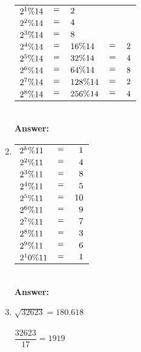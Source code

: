 \documentclass[8pt,a4paper]{article}
\begin{document}
\begin{enumerate}[itemsep=20pt]
\begin{tabular}[t]{l c l c r}
		\($$2^1\%14$$\) & \($$=$$\) & \($$2$$\) & \(\) & \(\) \\
		\($$2^2\%14$$\) & \($$=$$\) & \($$4$$\) & \(\) & \(\) \\
		\($$2^3\%14$$\) & \($$=$$\) & \($$8$$\) & \(\) & \(\) \\
		\($$2^4\%14$$\) & \($$=$$\) & \($$16\%14$$\) & \($$=$$\) & \($$2$$\)\\
		\($$2^5\%14$$\) & \($$=$$\) & \($$32\%14$$\) & \($$=$$\) & \($$4$$\)\\
		\($$2^6\%14$$\) & \($$=$$\) & \($$64\%14$$\) & \($$=$$\) & \($$8$$\)\\
		\($$2^7\%14$$\) & \($$=$$\) & \($$128\%14$$\) & \($$=$$\) & \($$2$$\)\\
		\($$2^8\%14$$\) & \($$=$$\) & \($$256\%14$$\) & \($$=$$\) & \($$4$$\)\\
	\end{tabular}\\
	\textbf{Answer: }\\
\item
	\begin{tabular}[t]{l c r}
		\($$2^k\%11$$\) & \($$=$$\) & \($$1$$\)\\
		\($$2^2\%11$$\) & \($$=$$\) & \($$4$$\)\\
		\($$2^3\%11$$\) & \($$=$$\) & \($$8$$\)\\
		\($$2^4\%11$$\) & \($$=$$\) & \($$5$$\)\\
		\($$2^5\%11$$\) & \($$=$$\) & \($$10$$\)\\
		\($$2^6\%11$$\) & \($$=$$\) & \($$9$$\)\\
		\($$2^7\%11$$\) & \($$=$$\) & \($$7$$\)\\
		\($$2^8\%11$$\) & \($$=$$\) & \($$3$$\)\\
		\($$2^9\%11$$\) & \($$=$$\) & \($$6$$\)\\
		\($$2^10\%11$$\) & \($$=$$\) & \($$1$$\)\\
	\end{tabular}\\
	\textbf{Answer: }\\			  	
\item
	$\sqrt{32623}=180.618$\\
	\\
	
	$\dfrac{32623}{17}=1919$\hfill{}\\
	

\end{enumerate}
\end{document}
